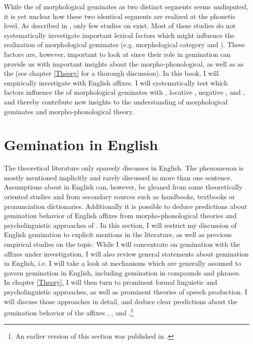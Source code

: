 While the  of  morphological geminates as two distinct segments seems undisputed, it is yet unclear how these two identical segments are realized at the phonetic level. As described in , only few studies on  exist. Most of these studies do not systematically investigate important lexical factors which might influence the realization of  morphological geminates (e.g. morphological category and ). These factors are, however, important to look at since their role in {gemination} can provide us with important insights about the morpho-phonological, as well as as the  (see chapter \ref{Theory} for a thorough discussion). 
In this book, I will empirically investigate  with English affixes. I will systematically test which factors influence the  of  morphological geminates with , locative , negative ,  and , and thereby contribute new insights to the understanding of  morphological geminates and morpho-phonological theory.


\section{Gemination in English} \label{Gemination in English}

The theoretical literature only sparsely discusses  in English. The phenomenon is mostly mentioned implicitly and rarely discussed in more than one sentence.  Assumptions about  in English can, however, be gleaned from some  theoretically oriented studies and from secondary sources such as handbooks, textbooks or pronunciation dictionaries. Additionally it is possible to deduce predictions about gemination behavior of English affixes from morpho-phonological theories and psycholinguistic approaches of . In this section, I will restrict my discussion of English gemination to explicit mentions in the literature, as well as previous empirical studies on the topic. While I will concentrate on gemination with the affixes under investigation, I will also review general statements about gemination in English, i.e. I will take a look at mechanisms which are generally assumed to govern gemination in English, including gemination in compounds and phrases.
In chapter \ref{Theory}, I will then turn to prominent formal linguistic and psycholinguistic approaches, as well as prominent theories of speech production. I will discuss those approaches in detail, and deduce clear predictions about the gemination behavior of the affixes , ,  and .\footnote{An earlier version of this section was published in \cite{BenHedia.2017}.}
\label{assumptions}
 

